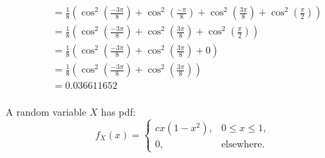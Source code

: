 \documentclass[answers]{exam}
\begin{document}
\begin{questions}
\begin{parts}
\begin{solution}
\begin{align*}
                      & = \frac{1}{8} \left(\cos^2 \left(\frac{-3 \pi}{8}\right) + \cos^2 \left(\frac{-\pi}{8}\right) + \cos^2 \left(\frac{3 \pi}{8}\right) + \cos^2 \left(\frac{\pi}{2}\right)\right)                                                                                                              \\
                      & = \frac{1}{8} \left(\cos^2 \left(\frac{-3 \pi}{8}\right) + \cos^2 \left(\frac{3 \pi}{8}\right) + \cos^2 \left(\frac{\pi}{2}\right)\right)                                                                                                                                                   \\
                      & = \frac{1}{8} \left(\cos^2 \left(\frac{-3 \pi}{8}\right) + \cos^2 \left(\frac{3 \pi}{8}\right) + 0\right)                                                                                                                                                                                   \\
                      & = \frac{1}{8} \left(\cos^2 \left(\frac{-3 \pi}{8}\right) + \cos^2 \left(\frac{3 \pi}{8}\right)\right)                                                                                                                                                                                       \\
                      & = 0.036611652                                                                                                                                                                                                                                                                               \\
            \end{align*}
        \end{solution}
    \end{parts}

    \question
    A random variable $X$ has pdf:
    \begin{equation*}
        f_X(x) = \begin{cases}
            c x (1 - x^2), & 0 \le x \le 1,    \\
            0,             & \text{elsewhere}.
        \end{cases}
    \end{equation*}
    \begin{parts}

\end{parts}
\end{questions}
\end{document}
